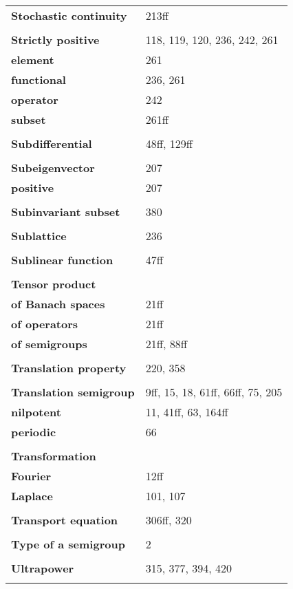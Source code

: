 \documentclass[10pt]{scrartcl}
\begin{document}
\begin{longtable}{>{\bfseries}p{6cm}p{8cm}}
\\
\textbf{Stochastic continuity} & 213ff \\
\\
\textbf{Strictly positive} & 118, 119, 120, 236, 242, 261 \\
\quad element & 261 \\
\quad functional & 236, 261 \\
\quad operator & 242 \\
\quad subset & 261ff \\
\\
\textbf{Subdifferential} & 48ff, 129ff \\
\\
\textbf{Subeigenvector} & 207 \\
\quad positive & 207 \\
\\
\textbf{Subinvariant subset} & 380 \\
\\
\textbf{Sublattice} & 236 \\
\\
\textbf{Sublinear function} & 47ff \\
\\
\textbf{Tensor product} & \\
\quad of Banach spaces & 21ff \\
\quad of operators & 21ff \\
\quad of semigroups & 21ff, 88ff \\
\\
\textbf{Translation property} & 220, 358 \\
\\
\textbf{Translation semigroup} & 9ff, 15, 18, 61ff, 66ff, 75, 205 \\
\quad nilpotent & 11, 41ff, 63, 164ff \\
\quad periodic & 66 \\
\\
\textbf{Transformation} & \\
\quad Fourier & 12ff \\
\quad Laplace & 101, 107 \\
\\
\textbf{Transport equation} & 306ff, 320 \\
\\
\textbf{Type of a semigroup} & 2 \\
\\
\textbf{Ultrapower} & 315, 377, 394, 420 \\
\\

\end{longtable}
\end{document}
